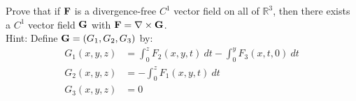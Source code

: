 \begin{tcolorbox}[
        title={Problem 20},
        valign=center,
        nobeforeafter,
        colframe=gray!95!black
    ]
    Prove that if \(\vb{F}\) is a divergence-free \(C^1\) vector field on all of \(\mathbb{R}^3\), then there exists a \(C^1\) vector field \(\vb{G}\) with \(\vb{F} = \nabla \times \vb{G}\). \\
    
    Hint: Define \(\vb{G} = (G_1, G_2, G_3)\) by:
    \begin{align}
        G_1(x, y, z) &= \int_0^z F_2(x, y, t) \ dt - \int_0^y F_3(x, t, 0) \ dt \\
        G_2(x, y, z) &= -\int_0^z F_1(x, y, t) \ dt \\
        G_3(x, y, z) &= 0
    \end{align}
\end{tcolorbox}

